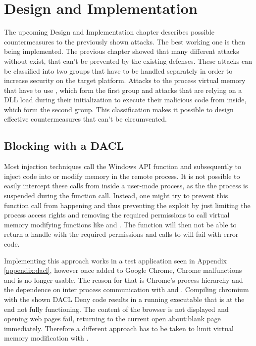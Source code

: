 \section{Design and Implementation}
The upcoming Design and Implementation chapter describes possible countermeasures to the previously shown attacks. The best working one is then being implemented.
\label{sec:implementation}
The previous chapter showed that many different attacks without exist, that can't be prevented by the existing defenses. These attacks can be classified into two groups that have to be handled separately in order to increase security on the target platform. Attacks to the process virtual memory that have to use , which form the first group and attacks that are relying on a DLL load during their initialization to execute their malicious code from inside, which form the second group. This classification makes it possible to design effective countermeasures that can't be circumvented. 

\subsection{Blocking  with a DACL}
\label{sec:implementation_dacl}
Most injection techniques call the Windows API function  and subsequently  to inject code into or modify memory in the remote process. It is not possible to easily intercept these calls from inside a user-mode process, as the the process is suspended during the  function call. Instead, one might try to prevent this function call from happening and thus preventing the exploit by just limiting the process access rights and removing the required permissions to call virtual memory modifying functions like  and . The  function will then not be able to return a handle with the required permissions and calls to  will fail with  error code.

Implementing this approach works in a test application seen in Appendix \ref{appendix:dacl}, however once added to Google Chrome, Chrome malfunctions and is no longer usable. The reason for that is Chrome's process hierarchy and the dependence on inter process communication with  and . Compiling chromium with the shown DACL Deny code results in a running executable that is at the end not fully functioning. The content of the browser is not displayed and opening web pages fail, returning to the current open about:blank page immediately. Therefore a different approach has to be taken to limit virtual memory modification with .


